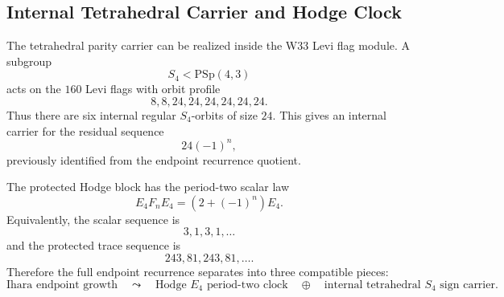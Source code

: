 \subsection{Internal Tetrahedral Carrier and Hodge Clock}
\label{subsec:bt646-internal-s4-hodge-clock}

The tetrahedral parity carrier can be realized inside the W33 Levi flag module.
A subgroup
\[
S_4<\mathrm{PSp}(4,3)
\]
acts on the \(160\) Levi flags with orbit profile
\[
\boxed{8,8,24,24,24,24,24,24.}
\]
Thus there are six internal regular \(S_4\)-orbits of size \(24\).  This gives
an internal carrier for the residual sequence
\[
\boxed{24(-1)^n,}
\]
previously identified from the endpoint recurrence quotient.

The protected Hodge block has the period-two scalar law
\[
\boxed{E_4F_nE_4=(2+(-1)^n)E_4.}
\]
Equivalently, the scalar sequence is
\[
3,1,3,1,\ldots
\]
and the protected trace sequence is
\[
243,81,243,81,\ldots .
\]
Therefore the full endpoint recurrence separates into three compatible pieces:
\[
\boxed{
\text{Ihara endpoint growth}
\quad\leadsto\quad
\text{Hodge }E_4\text{ period-two clock}
\quad\oplus\quad
\text{internal tetrahedral }S_4\text{ sign carrier.}
}
\]
